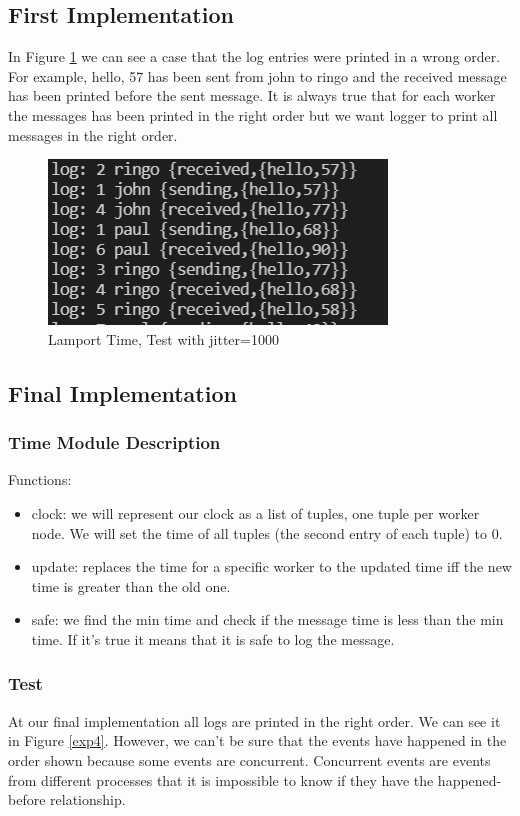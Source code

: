 \documentclass[a4paper, 11pt]{article}
\begin{document}
\subsection{First Implementation}
In Figure \ref{exp3} we can see a case that the log entries were printed in a wrong order. For example, {hello, 57} has been sent from john to ringo and the received message has been printed before the sent message. It is always true that for each worker the messages has been printed in the right order but we want logger to print all messages in the right order.
\begin{figure}
  \begin{center}
    \includegraphics[scale=0.4]{exp3.PNG}
    \caption{Lamport Time, Test with jitter=1000}
    \label{exp3}
  \end{center}
\end{figure}

\subsection{Final Implementation}
\subsubsection{Time Module Description}
Functions:
\begin{itemize}
  \item clock: we will represent our clock as a list of tuples, one tuple per worker node. We will set the time of all tuples (the second entry of each tuple) to 0.
  \item update: replaces the time for a specific worker to the updated time iff the new time is greater than the old one.
  \item safe: we find the min time and check if the message time is less than the min time. If it's true it means that it is safe to log the message.
\end{itemize}
\subsubsection{Test}
At our final implementation all logs are printed in the right order. We can see it in Figure \ref{exp4}. However, we can't be sure that the events have happened in the order shown because some events are concurrent. Concurrent events are events from different processes that it is impossible to know if they have the happened-before relationship.
\end{document}
